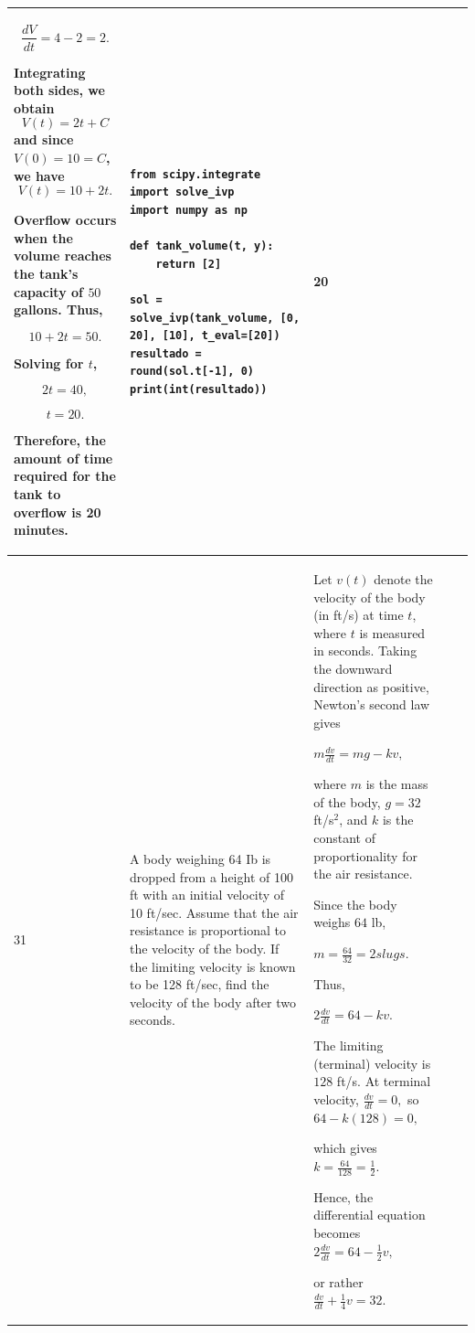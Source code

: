 \documentclass[a4paper,12pt]{article}
\begin{document}
\begin{longtable}{|p{0.3cm}|p{}|p{10cm}|p{}|p{1.5cm}|}
\[
\frac{dV}{dt}=4-2=2.
\]

Integrating both sides, we obtain
\[
V(t)=2t + C \] and since $V(0)= 10 =C$, we have
\[
V(t)=10+2t.
\]

Overflow occurs when the volume reaches the tank's capacity of \(50\) gallons. Thus,

\[
10+2t=50.
\]

Solving for \(t\),

\[
2t=40,
\]

\[
t=20.
\]

Therefore, the amount of time required for the tank to overflow is  20 minutes.






 &\begin{verbatim}
from scipy.integrate import solve_ivp
import numpy as np

def tank_volume(t, y):
    return [2]

sol = solve_ivp(tank_volume, [0, 20], [10], t_eval=[20])
resultado = round(sol.t[-1], 0)
print(int(resultado))\end{verbatim} &  20 \\ \hline
    31             &  A body weighing 64 Ib is dropped from a height of 100 ft with an initial velocity of 10 ft/sec. Assume
that the air resistance is proportional to the velocity of the body. If the limiting velocity is known to be
128 ft/sec, find  the velocity of the body after two seconds. & Let \(v(t)\) denote the velocity of the body (in ft/s) at time \(t\), where \(t\) is measured in seconds. Taking the downward direction as positive, Newton's second law gives

$
m\frac{dv}{dt}=mg-kv,
$

where \(m\) is the mass of the body, \(g=32\) ft/s\(^2\), and \(k\) is the constant of proportionality for the air resistance.

Since the body weighs \(64\) lb,

$
m=\frac{64}{32}=2 slugs.$


Thus,

$2\frac{dv}{dt}=64-kv.$

The limiting (terminal) velocity is \(128\) ft/s. At terminal velocity,
$\frac{dv}{dt}=0,$ so
$
64-k(128)=0,$

which gives $
k=\frac{64}{128}=\frac12.$

Hence, the differential equation becomes
$2\frac{dv}{dt}=64-\frac12v,$

or rather  $\frac{dv}{dt}+\frac14v=32.$


\end{longtable}
\end{document}
